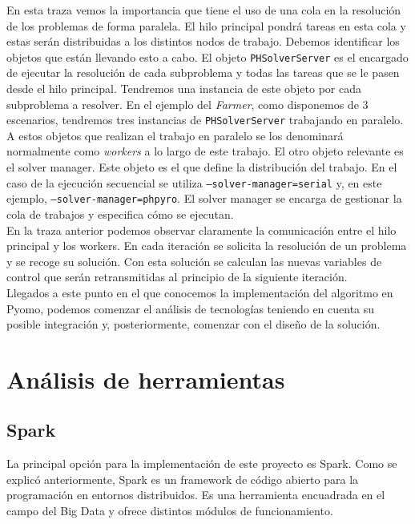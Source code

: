 En esta traza vemos la importancia que tiene el uso de una cola en la resolución de los problemas de forma paralela. El hilo principal pondrá tareas en esta cola y estas serán distribuidas a los distintos nodos de trabajo. Debemos identificar los objetos que están llevando esto a cabo. El objeto \texttt{PHSolverServer} es el encargado de ejecutar la resolución de cada subproblema y todas las tareas que se le pasen desde el hilo principal. Tendremos una instancia de este objeto por cada subproblema a resolver. En el ejemplo del \textit{Farmer}, como disponemos de 3 escenarios, tendremos tres instancias de \texttt{PHSolverServer} trabajando en paralelo. A estos objetos que realizan el trabajo en paralelo se los denominará normalmente como \textit{workers} a lo largo de este trabajo. El otro objeto relevante es el solver manager. Este objeto es el que define la distribución del trabajo. En el caso de la ejecución secuencial se utiliza \texttt{--solver-manager=serial} y, en este ejemplo, \texttt{--solver-manager=phpyro}. El solver manager se encarga de gestionar la cola de trabajos y especifica cómo se ejecutan.\\

En la traza anterior podemos observar claramente la comunicación entre el hilo principal y los workers. En cada iteración se solicita la resolución de un problema y se recoge su solución. Con esta solución se calculan las nuevas variables de control que serán retransmitidas al principio de la siguiente iteración. \\

Llegados a este punto en el que conocemos la implementación del algoritmo en Pyomo, podemos comenzar el análisis de tecnologías teniendo en cuenta su posible integración y, posteriormente, comenzar con el diseño de la solución.

\section{Análisis de herramientas}
\label{sec:herramientasAlternativas}

\subsection{Spark}


La principal opción para la implementación de este proyecto es Spark. Como se explicó anteriormente, Spark es un framework de código abierto para la programación en entornos distribuidos. Es una herramienta encuadrada en el campo del Big Data y ofrece distintos módulos de funcionamiento.\\

